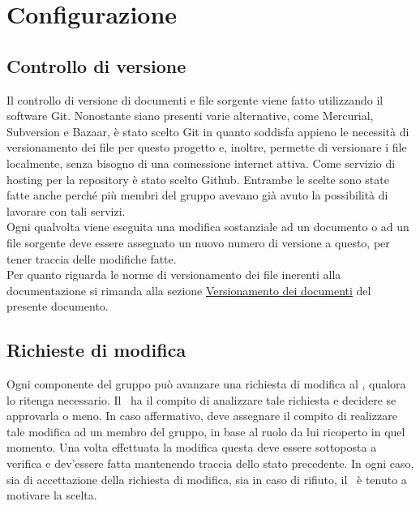 \documentclass[../NormeProgetto.tex]{subfiles}
\begin{document}
	\section{Configurazione}
	\subsection{Controllo di versione}
	Il controllo di versione di documenti e file sorgente viene fatto utilizzando il software Git. Nonostante siano presenti varie alternative, come Mercurial, Subversion e Bazaar, è stato scelto Git in quanto soddisfa appieno le necessità di versionamento dei file per questo progetto e, inoltre, permette di versionare i file localmente, senza bisogno di una connessione internet attiva. Come servizio di hosting per la repository è stato scelto Github. Entrambe le scelte sono state fatte anche perché più membri del gruppo avevano già avuto la possibilità di lavorare con tali servizi. \\ Ogni qualvolta viene eseguita una modifica sostanziale ad un documento o ad un file sorgente deve essere assegnato un nuovo numero di versione a questo, per tener traccia delle modifiche fatte. \\ Per quanto riguarda le norme di versionamento dei file inerenti alla documentazione si rimanda alla sezione \hyperref[sec:Versionamento dei documenti]{Versionamento dei documenti} del presente documento.
	\subsection{Richieste di modifica}
	Ogni componente del gruppo può avanzare una richiesta di modifica al \responsabilediprogetto, qualora lo ritenga necessario. Il \responsabilediprogetto\ ha il compito di analizzare tale richiesta e decidere se approvarla o meno. In caso affermativo, deve assegnare il compito di realizzare tale modifica ad un membro del gruppo, in base al ruolo da lui ricoperto in quel momento. Una volta effettuata la modifica questa deve essere sottoposta a verifica e dev'essere fatta mantenendo traccia dello stato precedente. In ogni caso, sia di accettazione della richiesta di modifica, sia in caso di rifiuto, il \responsabilediprogetto\ è tenuto a motivare la scelta.
\end{document}
